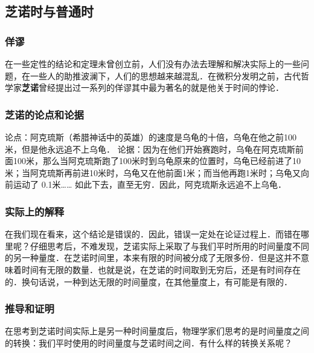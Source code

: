 
\begin{issues}
\issueTODO
\end{issues}

\subsection{芝诺时与普通时}

\subsubsection{佯谬}
在一些定性的结论和定理未曾创立前，人们没有办法去理解和解决实际上的一些问题，在一些人的助推波澜下，人们的思想越来越混乱．在微积分发明之前，古代哲学家\textbf{芝诺}曾经提出过一系列的佯谬其中最为著名的就是他关于时间的悖论．

\subsubsection{芝诺的论点和论据}
论点：阿克琉斯（希腊神话中的英雄）的速度是乌龟的十倍，乌龟在他之前100米，但是他永远追不上乌龟．
论据：因为在他们开始赛跑时，乌龟在阿克琉斯前面100米，那么当阿克琉斯跑了100米时到乌龟原来的位置时，乌龟已经前进了10米；当阿克琉斯再前进10米时，乌龟又在他前面1米；而当他再跑1米时；乌龟又向前运动了  0.1米…… 如此下去，直至无穷．因此，阿克琉斯永远追不上乌龟．

\subsubsection{实际上的解释}
在我们现在看来，这个结论是错误的．因此，错误一定处在论证过程上．而错在哪里呢？仔细思考后，不难发现，芝诺实际上采取了与我们平时所用的时间量度不同的另一种量度．在芝诺时间里，本来有限的时间被分成了无限多份．但是这并不意味着时间有无限的数量．也就是说，在芝诺的时间取到无穷后，还是有时间存在的．换句话说，一种到达无限的时间量度，在其他量度上，有可能是有限的．

\subsubsection{推导和证明}
在思考到芝诺时间实际上是另一种时间量度后，物理学家们思考的是时间量度之间的转换：我们平时使用的时间量度与芝诺时间之间．有什么样的转换关系呢？

